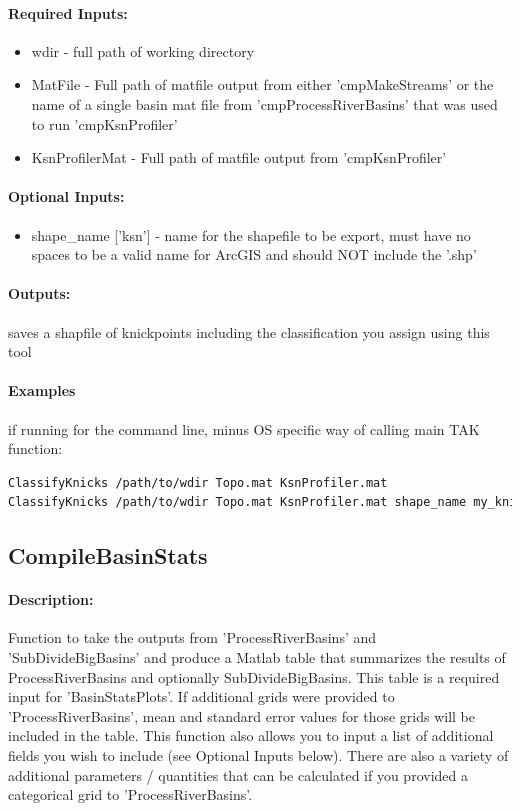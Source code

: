\paragraph{Required Inputs:}
\begin{itemize}
	\item wdir - full path of working directory
	\item MatFile - Full path of matfile output from either 'cmpMakeStreams' or the name of a single basin mat file from 
	'cmpProcessRiverBasins' that was used to run 'cmpKsnProfiler'
	\item KsnProfilerMat - Full path of matfile output from 'cmpKsnProfiler'
\end{itemize}

\paragraph{Optional Inputs:}
\begin{itemize}
\item shape\_name ['ksn'] - name for the shapefile to be export, must have no spaces to be a valid name for ArcGIS and should NOT include the '.shp'
\end{itemize}

\paragraph{Outputs:}
saves a shapfile of knickpoints including the classification you assign using this tool

\paragraph{Examples} if running for the command line, minus OS specific way of calling main TAK function:
\begin{lstlisting}[language=bash]
ClassifyKnicks /path/to/wdir Topo.mat KsnProfiler.mat
ClassifyKnicks /path/to/wdir Topo.mat KsnProfiler.mat shape_name my_knicks
\end{lstlisting}

\subsection{CompileBasinStats} \label{sec:CmpCmpBsnStats}
\paragraph{Description:}
Function to take the outputs from 'ProcessRiverBasins' and 'SubDivideBigBasins' and produce a Matlab table that summarizes the results of ProcessRiverBasins
and optionally SubDivideBigBasins. This table is a required input for 'BasinStatsPlots'. If additional grids were provided to 'ProcessRiverBasins', mean and 
standard error values for those grids will be included in the table. This function also allows you to input a list of additional fields you wish to include 
(see Optional Inputs below). There are also a variety of additional parameters / quantities that can be calculated if you provided a categorical grid
to 'ProcessRiverBasins'.

